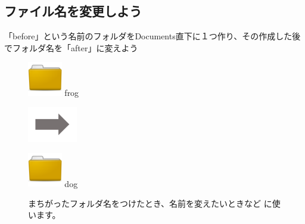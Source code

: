 \documentclass[a4paper,12pt]{jarticle}
\begin{document}
\clearpage
{}
\subsection{\theExercise ファイル名を変更しよう}
「before」という名前のフォルダをDocuments直下に１つ作り、その作成した後でフォルダ名を「after」に変えよう

\begin{figure}[ht]

  \centering
  \begin{minipage}{1.978cm}
    \includegraphics[width=1.5cm]{textbook-img044.png}
    frog
  \end{minipage}
  \includegraphics[width=2.168cm]{textbook-img052.png}
  \begin{minipage}{1.978cm}
    \includegraphics[width=1.5cm]{textbook-img044.png}
    dog
  \end{minipage}
  \begin{minipage}{6.319cm}
    まちがったフォルダ名をつけたとき、名前を変えたいときなど
    に使います。
  \end{minipage}


\end{figure}
\end{document}
